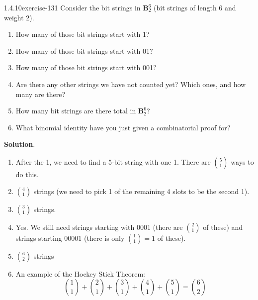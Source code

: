 \documentclass[twoside,11pt,]{book}
\numberwithin{equation}{chapter}
\newcommand{\B}{\mathbf B}
\begin{document}
\begin{divisionsolution}{1.4.10}{}{exercise-131}%
\hypertarget{p-2135}{}%
Consider the bit strings in \(\B^6_2\) (bit strings of length 6 and weight 2).%
\leavevmode%
\begin{enumerate}[label=(\alph*)]
\item\hypertarget{li-1327}{}\hypertarget{p-2136}{}%
How many of those bit strings start with 1?%
\item\hypertarget{li-1328}{}\hypertarget{p-2137}{}%
How many of those bit strings start with 01?%
\item\hypertarget{li-1329}{}\hypertarget{p-2138}{}%
How many of those bit strings start with 001?%
\item\hypertarget{li-1330}{}\hypertarget{p-2139}{}%
Are there any other strings we have not counted yet? Which ones, and how many are there?%
\item\hypertarget{li-1331}{}\hypertarget{p-2140}{}%
How many bit strings are there total in \(\B^6_2\)?%
\item\hypertarget{li-1332}{}\hypertarget{p-2141}{}%
What binomial identity have you just given a combinatorial proof for?%
\end{enumerate}
\par\smallskip%
\noindent\textbf{Solution}.\quad%
\hypertarget{p-2142}{}%
\leavevmode%
\begin{enumerate}[label=(\alph*)]
\item\hypertarget{li-1333}{}\hypertarget{p-2143}{}%
After the 1, we need to find a 5-bit string with one 1. There are \({5 \choose 1}\) ways to do this.%
\item\hypertarget{li-1334}{}\({4 \choose 1}\) strings (we need to pick 1 of the remaining 4 slots to be the second 1).%
\item\hypertarget{li-1335}{}\({3 \choose 1}\) strings.%
\item\hypertarget{li-1336}{}\hypertarget{p-2144}{}%
Yes. We still need strings starting with 0001 (there are \({2 \choose 1}\) of these) and strings starting 00001 (there is only \({1 \choose 1} = 1\) of these).%
\item\hypertarget{li-1337}{}\({6 \choose 2}\) strings%
\item\hypertarget{li-1338}{}\hypertarget{p-2145}{}%
An example of the Hockey Stick Theorem:%
\begin{equation*}
{1 \choose 1} + {2 \choose 1} + {3 \choose 1} + {4 \choose 1} + {5 \choose 1} = {6 \choose 2}
\end{equation*}
%
\end{enumerate}
%
\end{divisionsolution}%
\end{document}
